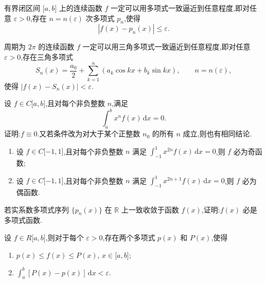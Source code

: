 \documentclass[../数学分析培优讲义.tex]{subfiles}
\begin{document}
\begin{proposition}
有界闭区间 $\lbrack a,b\rbrack$ 上的连续函数 $f$ 一定可以用多项式一致逼近到任意程度,即对任意 $\varepsilon>0$,存在 $n=n(\varepsilon)$ 次多项式 $p_n$,使得
\[
    |f(x)-p_n(x)|\leq\varepsilon.
\]
\end{proposition}

\begin{proposition}
周期为 $2\pi$ 的连续函数 $f$ 一定可以用三角多项式一致逼近到任意程度,即对任意 $\varepsilon>0$,存在三角多项式
\[
    S_n(x)=\dfrac{a_0}{2}+\sum\limits_{k=1}^{n}(a_k\cos kx+b_k\sin kx),
    \qquad n=n(\varepsilon),
\]
使得 $|f(x)-S_n(x)|<\varepsilon$.
\end{proposition}

\begin{example}
设 $f\in C\lbrack a,b\rbrack$,且对每个非负整数 $n$,满足
\[
    \int_a^bx^nf(x)\,\mathrm{d}x=0.
\]
证明:$f\equiv0$.又若条件改为对大于某个正整数 $n_0$ 的所有 $n$ 成立,则也有相同结论.
\end{example}
\exampleblank

\begin{example}
\begin{enumerate}[label=(\arabic*)]
    \item 设 $f\in C\lbrack -1,1\rbrack$,且对每个非负整数 $n$ 满足 $\displaystyle\int_{-1}^{1}x^{2n}f(x)\,\mathrm{d}x=0$,则 $f$ 必为奇函数;
    \item 设 $f\in C\lbrack -1,1\rbrack$,且对每个非负整数 $n$ 满足 $\displaystyle\int_{-1}^{1}x^{2n+1}f(x)\,\mathrm{d}x=0$,则 $f$ 必为偶函数.
\end{enumerate}
\end{example}
\exampleblank

\begin{example}
若实系数多项式序列 $\{p_n(x)\}$ 在 $\mathbb R$ 上一致收敛于函数 $f(x)$,证明:$f(x)$ 必是多项式函数.
\end{example}
\exampleblank

\begin{example}
设 $f\in R\lbrack a,b\rbrack$,则对于每个 $\varepsilon>0$,存在两个多项式 $p(x)$ 和 $P(x)$,使得
\begin{enumerate}[label=(\arabic*)]
    \item $p(x)\leq f(x)\leq P(x)$, $x\in\lbrack a,b\rbrack$;
    \item $\displaystyle\int_a^b[P(x)-p(x)]\,\mathrm{d}x<\varepsilon$.
\end{enumerate}
\end{example}
\exampleblank
\end{document}
